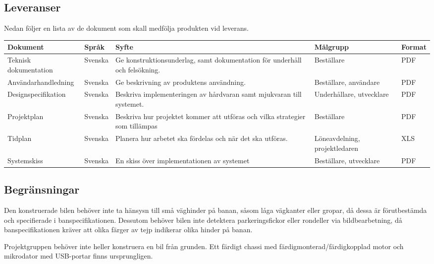 \documentclass[projektplan/plan.tex]{subfiles}
\begin{document}
\noindent
\begin{minipage}{\textwidth}
\subsection{Leveranser}
\label{sec:doc}
Nedan följer en lista av de dokument som skall medfölja produkten vid leverans.
{\renewcommand{\arraystretch}{1.6}
\begin{longtable}{p{4.5cm}p{1.5cm}p{5cm}p{2.2cm}p{1.2cm}}
    \bfseries Dokument &
    \bfseries Språk &
    \bfseries Syfte &
    \bfseries Målgrupp &
    \bfseries Format \\\hline
    Teknisk dokumentation &
    Svenska &
    Ge konstruktionsunderlag, samt dokumentation för underhåll och
    felsökning. &
    Beställare &
    PDF
    \\
    Användarhandledning &
    Svenska &
    Ge beskrivning av produktens användning. &
    Beställare, användare &
    PDF
    \\
    Designspecifikation &
    Svenska &
    Beskriva implementeringen av hårdvaran samt mjukvaran till systemet. &
    Underhållare, utvecklare &
    PDF
    \\
    Projektplan &
    Svenska &
    Beskriva hur projektet kommer att utföras och vilka strategier som
    tillämpas &
    Beställare &
    PDF
    \\
    Tidplan &
    Svenska &
    Planera hur arbetet ska fördelas och när det ska utföras. &
    Löne\-avdelning, projekt\-ledaren &
    XLS
    \\
    Systemskiss &
    Svenska &
    En skiss över implementationen av systemet &
    Beställare, utvecklare &
    PDF
    \\
    
    \endhead
\end{longtable}}
\end{minipage}

\subsection{Begränsningar}
Den konstruerade bilen behöver inte ta hänsysn till små väghinder på banan,
såsom låga vägkanter eller gropar, då dessa är förutbestämda och specifierade i
banspecifikationen. Dessutom behöver bilen inte detektera parkeringsfickor
eller rondeller via bildbearbetning, då banspecifikationen kräver att olika
färger av tejp indikerar olika hinder på banan.

Projektgruppen behöver inte heller konstruera en bil från grunden. Ett färdigt
chassi med färdigmonterad/färdigkopplad motor och mikrodator med
USB-portar finns ursprungligen. 
\end{document}
